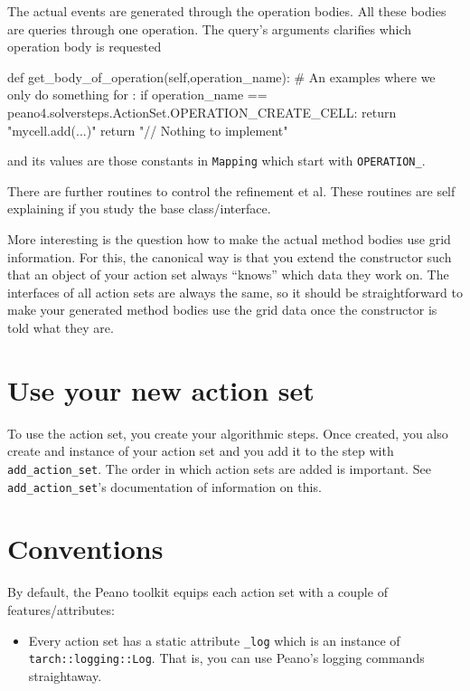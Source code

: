 \noindent
The actual events are generated through the operation bodies.
All these bodies are queries through one operation. 
The query's arguments clarifies which operation body is requested

\begin{code}
  def get_body_of_operation(self,operation_name):
    # An examples where we only do something for :
    if operation_name == peano4.solversteps.ActionSet.OPERATION_CREATE_CELL:
      return "mycell.add(...)\n"
    return "// Nothing to implement\n"
\end{code}

\noindent
and its values are those constants in \texttt{Mapping} which start with
\texttt{OPERATION\_}.


There are further routines to control the refinement et al.
These routines are self explaining if you study the base class/interface.


More interesting is the question how to make the actual method bodies use grid
information.
For this, the canonical way is that you extend the constructor such that an
object of your action set always ``knows'' which data they work on. 
The interfaces of all action sets are always the same, so it should be
straightforward to make your generated method bodies use the grid data once the
constructor is told what they are.


\section{Use your new action set}

To use the action set, you create your algorithmic steps.
Once created, you also create and instance of your action set and you add it to the
step with \texttt{add\_action\_set}.
The order in which action sets are added is important.
See \texttt{add\_action\_set}'s documentation of information on this.



\section{Conventions}

By default, the Peano toolkit equips each action set with a couple of
features/attributes:

\begin{itemize}
  \item Every action set has a static attribute \texttt{\_log} which is an instance
  of \texttt{tarch::logging::Log}. That is, you can use Peano's logging commands
  straightaway.
\end{itemize}

